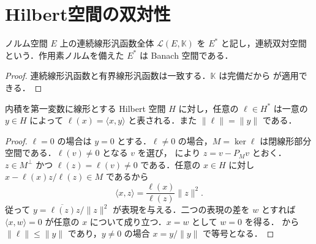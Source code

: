 \section{Hilbert空間の双対性}
\begin{defn}[連続双対空間]
ノルム空間 $E$ 上の連続線形汎函数全体 $\mathcal L(E,\mathbb K)$ を $E^*$ と記し，連続双対空間という．作用素ノルムを備えた $E^*$ は Banach 空間である．
\end{defn}
\begin{proof}
連続線形汎函数と有界線形汎函数は一致する．$\mathbb K$ は完備だから  が適用できる．
\end{proof}
\begin{prop}[Rieszの表現定理]
内積を第一変数に線形とする Hilbert 空間 $H$ に対し，任意の $\ell\in H^*$ は一意の $y\in H$ によって $\ell(x)=\langle x,y\rangle$ と表される．また $\|\ell\|=\|y\|$ である．
\end{prop}
\begin{proof}
$\ell=0$ の場合は $y=0$ とする．$\ell\ne0$ の場合，$M=\ker\ell$ は閉線形部分空間である．$\ell(v)\ne0$ となる $v$ を選び， により $z=v-P_Mv$ とおく．$z\in M^\perp$ かつ $\ell(z)=\ell(v)\ne0$ である．任意の $x\in H$ に対し $x-\ell(x)z/\ell(z)\in M$ であるから
\[
\langle x,z\rangle=\frac{\ell(x)}{\ell(z)}\|z\|^2 .
\]
従って $y=\overline{\ell(z)}z/\|z\|^2$ が表現を与える．二つの表現の差を $w$ とすれば $\langle x,w\rangle=0$ が任意の $x$ について成り立つ．$x=w$ として $w=0$ を得る． から $\|\ell\|\leq\|y\|$ であり，$y\ne0$ の場合 $x=y/\|y\|$ で等号となる．
\end{proof}
